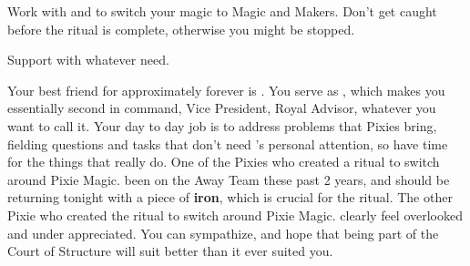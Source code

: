 \documentclass[char]{PP}
\begin{document}
\begin{itemz}
	\item Work with \cMChange{} and \cFWanabe{} to switch your magic to Magic and Makers. Don't get caught before the ritual is complete, otherwise you might be stopped.
	\item Support \cSHead{} with whatever \cSHead{\they} need\cSHead{\plural}.
\end{itemz}

\begin{itemz}[Notes]
	\item 
\end{itemz}

\begin{contacts}
	\contact{\cSHead{}} Your best friend for approximately forever is \cSHead{}. You serve as \cSHead{\Their} \cSAdvisor{\Heir}, which makes you essentially \cSHead{\their}second in command, Vice President, Royal Advisor, whatever you want to call it. Your day to day job is to address problems that Pixies bring, fielding questions and tasks that don't need \cSHead{}'s personal attention, so \cSHead{\They} have time for the things that really do.
	\contact{\cMChange{}}  One of the Pixies who created a ritual to switch around Pixie Magic. \cMChange{\They} \cMChange{\have} been on the Away Team these past 2 years, and should be returning tonight with a piece of \textbf{iron}, which is crucial for the ritual.
	\contact{\cFWanabe{}} The other Pixie who created the ritual to switch around Pixie Magic. \cFWanabe{\They} clearly feel\cFWanabe{\plural} overlooked and under appreciated. You can sympathize, and hope that being part of the Court of Structure will suit \cFWanabe{} better than it ever suited you.
\end{contacts}
\end{document}
